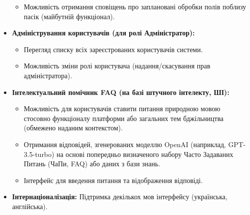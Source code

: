 \begin{itemize}
\begin{itemize}
            \item Можливість отримання сповіщень про заплановані обробки полів поблизу пасік (майбутній функціонал).
        \end{itemize}
    \item \textbf{Адміністрування користувачів (для ролі Адміністратор):}
        \begin{itemize}
            \item Перегляд списку всіх зареєстрованих користувачів системи.
            \item Можливість зміни ролі користувача (надання/скасування прав адміністратора).
        \end{itemize}
    \item \textbf{Інтелектуальний помічник FAQ (на базі штучного інтелекту, ШІ):}
        \begin{itemize}
            \item Можливість для користувачів ставити питання природною мовою стосовно функціоналу платформи або загальних тем бджільництва (обмежено наданим контекстом).
            \item Отримання відповідей, згенерованих моделлю OpenAI (наприклад, GPT-3.5-turbo) на основі попередньо визначеного набору Часто Задаваних Питань (ЧаПи, FAQ) або даних з бази знань.
            \item Інтерфейс для введення питання та відображення відповіді.
        \end{itemize}
    \item \textbf{Інтернаціоналізація:} Підтримка декількох мов інтерфейсу (українська, англійська).
\end{itemize}

